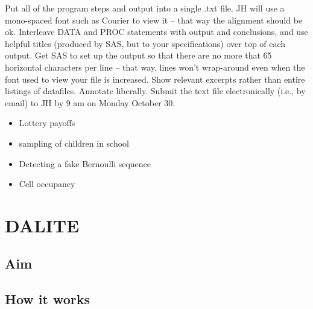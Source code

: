 \documentclass[]{book}
\begin{document}
Put all of the program steps and output into a single .txt file. JH will use a mono-spaced font such as Courier to view it -- that way the alignment should be ok. Interleave DATA and PROC statements with output and conclusions, and use helpful titles (produced by SAS, but to your specifications) over top of each output. Get SAS to set up the output so that there are no more that 65 horizontal characters per line -- that way, lines won't wrap-around even when the font used to view your file is increased. Show relevant excerpts rather than entire listings of datafiles. Annotate liberally. Submit the text file electronically (i.e., by email) to JH by 9 am on Monday October 30.

\begin{itemize}
\item
  Lottery payoffs
\item
  sampling of children in school
\item
  Detecting a fake Bernoulli sequence
\item
  Cell occupancy
\end{itemize}

\hypertarget{dalite}{%
\chapter{DALITE}\label{dalite}}

\hypertarget{aim}{%
\section{Aim}\label{aim}}

\hypertarget{how-it-works}{%
\section{How it works}\label{how-it-works}}


\end{document}
